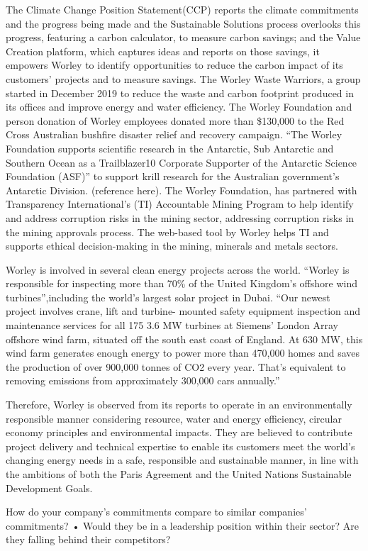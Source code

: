 \documentclass[11pt,a4paper,]{article}
\begin{document}
The Climate Change Position Statement(CCP) reports the climate commitments and the progress being made and the Sustainable Solutions process overlooks this progress, featuring a carbon calculator, to measure carbon savings; and the Value Creation platform, which captures ideas and reports on those savings, it empowers Worley to identify opportunities to reduce the carbon impact of its customers' projects and to measure savings. The Worley Waste Warriors, a group started in December 2019 to reduce the waste and carbon footprint produced in its offices and improve energy and water efficiency. The Worley Foundation and person donation of Worley employees donated more than \$130,000 to the Red Cross Australian bushfire disaster relief and recovery campaign. ``The Worley Foundation supports scientific research in the Antarctic, Sub Antarctic and Southern Ocean as a Trailblazer10 Corporate Supporter of the Antarctic Science Foundation (ASF)'' to support krill research for the Australian government's Antarctic Division. (reference here). The Worley Foundation, has partnered with Transparency International's (TI) Accountable Mining Program to help identify and address corruption risks in the mining sector, addressing corruption risks in the mining approvals process. The web-based tool by Worley helps TI and supports ethical decision-making in the mining, minerals and metals sectors.

Worley is involved in several clean energy projects across the world. ``Worley is responsible for inspecting more than 70\% of the United Kingdom's offshore wind turbines'',including the world's largest solar project in Dubai. ``Our newest project involves crane, lift and turbine- mounted safety equipment inspection and maintenance services for all 175 3.6 MW turbines at Siemens' London Array offshore wind farm, situated off the south east coast of England. At 630 MW, this wind farm generates enough energy to power more than 470,000 homes and saves the production of over 900,000 tonnes of CO2 every year. That's equivalent to removing emissions from approximately 300,000 cars annually.''

Therefore, Worley is observed from its reports to operate in an environmentally responsible manner considering resource, water and energy efficiency, circular economy principles and environmental impacts. They are believed to contribute project delivery and technical expertise to enable its customers meet the world's changing energy needs in a safe, responsible and sustainable manner, in line with the ambitions of both the Paris Agreement and the United Nations Sustainable Development Goals.

How do your company's commitments compare to similar companies' commitments?
• Would they be in a leadership position within their sector? Are they falling behind their competitors?

\printbibliography
\end{document}
